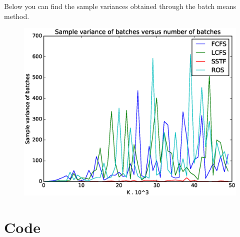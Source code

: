 \documentclass[a4paper]{article}
\begin{document}
Below you can find the sample variances obtained through the batch means method.
\begin{figure}[H]
  \centering
  \includegraphics[width=0.6\linewidth]{../figures/batch_mean_var}
  \label{fig:bmv}
\end{figure}

\section{Code}
\label{sec:code}
\inputminted[numbersep=7pt,fontsize=\footnotesize,linenos]{python}{../src/main.py}
\inputminted[numbersep=7pt,fontsize=\footnotesize,linenos]{python}{../src/strategy.py}
\inputminted[numbersep=7pt,fontsize=\footnotesize,linenos]{python}{../src/agenda.py}
\inputminted[numbersep=7pt,fontsize=\footnotesize,linenos]{python}{../src/customer.py}
\inputminted[numbersep=7pt,fontsize=\footnotesize,linenos]{python}{../src/FCFS.py}
\inputminted[numbersep=7pt,fontsize=\footnotesize,linenos]{python}{../src/LCFS.py}
\inputminted[numbersep=7pt,fontsize=\footnotesize,linenos]{python}{../src/SSTF.py}
\inputminted[numbersep=7pt,fontsize=\footnotesize,linenos]{python}{../src/ROS.py}
\end{document}
